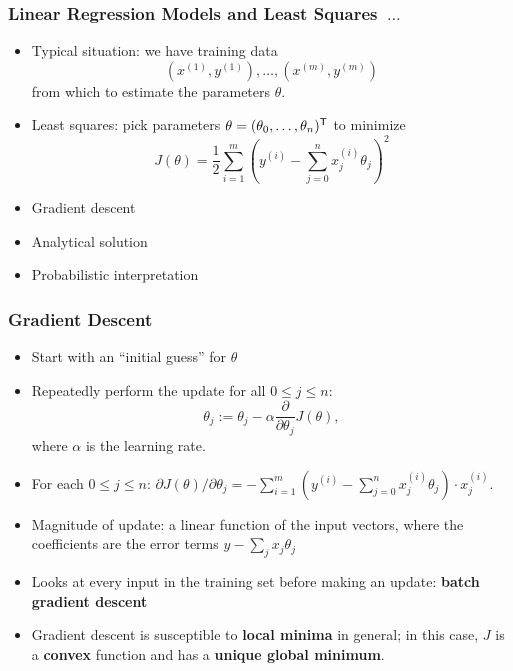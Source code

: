 \documentclass[xcolor=table]{beamer}
\newcommand{\trans}[1]{\ensuremath{#1}^{\scriptsize{\textsf{T}}}}
\begin{document}
\begin{frame}[t]
\frametitle{Linear Regression Models and Least Squares~$\ldots$}
\begin{itemize}
    \item Typical situation: we have training data 
    \[(x^{(1)}, y^{(1)}), \ldots, (x^{(m)}, y^{(m)})\] 
    from which to estimate the parameters $\theta$.
    
    \item Least squares: pick parameters $\theta = \trans{(\theta_0, \ldots, \theta_n)}$ to minimize 
    \[J(\theta) = 
    \frac{1}{2} \sum_{i = 1}^{m} \left (y^{(i)} - \sum_{j = 0}^{n} x^{(i)}_j \theta_j \right )^2\]   
\end{itemize}

\pause

\begin{itemize}
    \item Gradient descent
    \item Analytical solution
    \item Probabilistic interpretation
\end{itemize}
\end{frame}

\begin{frame}[t]
\frametitle{Gradient Descent}
\begin{itemize}
    \item Start with an ``initial guess'' for $\theta$

    \pause

    \item Repeatedly perform the update for all $0 \leq j \leq n$:
    \[
        \theta_j := \theta_j - \alpha \frac{\partial}{\partial \theta_j} J(\theta),
    \]
    where $\alpha$ is the learning rate.

    \pause 

    \item For each $0 \leq j \leq n$:
    $
        \partial J(\theta)/ \partial \theta_j = - \sum_{i = 1}^m 
        \left ( y^{(i)} - \sum_{j = 0}^n x_j^{(i)} \theta_j \right ) \cdot x_j^{(i)}.
    $
    
    \pause

    \item Magnitude of update: a linear function of the input vectors, where the
    coefficients are the error terms $y - \sum_j x_j \theta_j$

    \pause

    \item Looks at every input in the training set before making an update: \pause
    \textbf{batch gradient descent}
    
    \pause

    \item Gradient descent is susceptible to \textbf{local minima} in general; in
    this case, $J$ is a \textbf{convex} function and has a \textbf{unique global
    minimum}.  
\end{itemize}
\end{frame}
\end{document}
